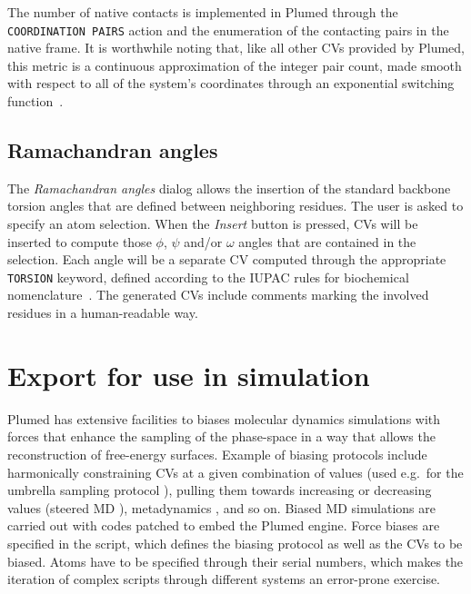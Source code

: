 \documentclass[preprint,review,11pt]{elsarticle}
\begin{document}
The number of native contacts is implemented in Plumed through the
\texttt{COORDINATION PAIRS} action and the enumeration of the
contacting pairs in the native frame.  It is worthwhile noting that,
like all other CVs provided by Plumed, this metric is a continuous
approximation of the integer pair count, made smooth with respect to
all of the system's coordinates through an exponential switching
function~\cite{plumed_manual}.




\subsection{Ramachandran angles}

The \emph{Ramachandran angles} dialog allows the insertion of the
standard backbone torsion angles that are defined between neighboring residues.
The user is asked to specify an atom selection. When the \emph{Insert}
button is pressed, CVs will be inserted to compute those $\phi$,
$\psi$ and/or $\omega$ angles that are contained in the
selection. Each angle will be a separate CV computed through the
appropriate \texttt{TORSION} keyword, defined according to the IUPAC
rules for biochemical nomenclature~\cite{IUPAC}. The generated CVs
include comments marking the involved residues in a human-readable
way.








\section{Export for use in simulation}\label{sec:export-use-simul}

Plumed has extensive facilities to biases molecular dynamics
simulations with forces that enhance the sampling of the phase-space
in a way that allows the reconstruction of free-energy
surfaces. Example of biasing protocols include harmonically
constraining CVs at a given combination of values (used e.g.\ for the
umbrella sampling protocol \cite{Torrie_Valleau_1977}), pulling them
towards increasing or decreasing values (steered MD
\cite{Isralewitz_Gao_Schulten_2001,Giorgino_2011}), metadynamics
\cite{Laio_Parrinello_2002}, and so on. Biased MD simulations are
carried out with codes patched to embed the Plumed engine. Force
biases are specified in the script, which defines the biasing protocol
as well as the CVs to be biased.  Atoms have to be specified
through their serial numbers, which makes the iteration of complex
scripts through different systems an error-prone exercise.
\end{document}
